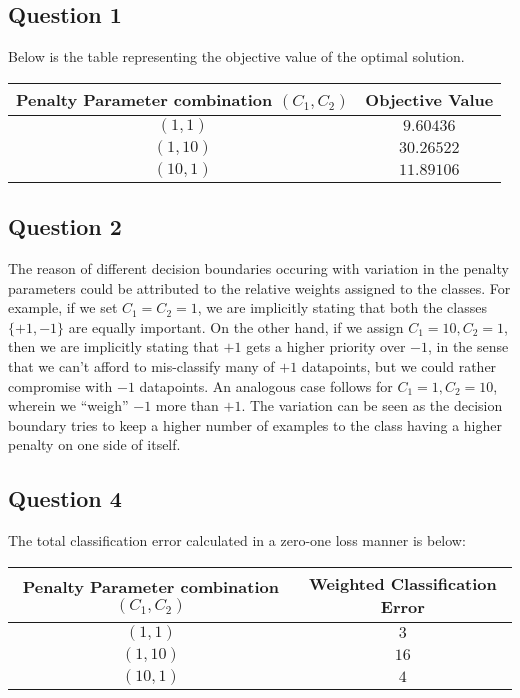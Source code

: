 \documentclass{article}
\begin{document}
\subsection*{Question 1}
\begin{flushleft}
Below is the table representing the objective value of the optimal solution.
\begin{center}
\begin{tabular}{|c|c|}
\hline
Penalty Parameter combination \((C_{1}, C_{2})\) & Objective Value \\
\hline
\hline
\((1, 1)\) & \(9.60436\)\\
\hline
\((1, 10)\) & \(30.26522\)\\
\hline
\((10, 1)\) & \(11.89106\)\\
\hline
\end{tabular}
\end{center}
\end{flushleft}

\subsection*{Question 2}
The reason of different decision boundaries occuring with variation in the penalty parameters could be attributed to the relative weights assigned to the classes. For example, if we set \(C_{1} = C_{2} = 1\), we are implicitly stating that both the classes \(\{+1, -1\}\) are equally important. On the other hand, if we assign \(C_{1} = 10, C_{2} = 1\), then we are implicitly stating that \(+1\) gets a higher priority over \(-1\), in the sense that we can't afford to mis-classify many of \(+1\) datapoints, but we could rather compromise with \(-1\) datapoints. An analogous case follows for \(C_{1} = 1, C_{2} = 10\), wherein we ``weigh'' \(-1\) more than \(+1\). The variation can be seen as the decision boundary tries to keep a higher number of examples to the class having a higher penalty on one side of itself.

\subsection*{Question 4}
The total classification error calculated in a zero-one loss manner is below:
\begin{center}
\begin{tabular}{|c|c|}
\hline
Penalty Parameter combination \((C_{1}, C_{2})\) & Weighted Classification Error \\
\hline
\hline
\((1, 1)\) & \(3\) \\
\hline
\((1, 10)\) & \(16\) \\
\hline
\((10, 1)\) & \(4\) \\
\hline
\end{tabular}
\end{center}
\end{document}
